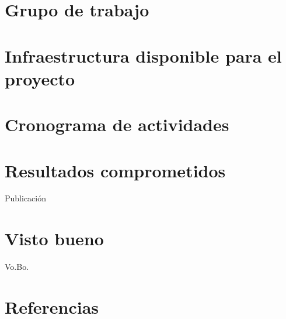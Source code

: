 \documentclass[12pt,letterpaper,final,titlepage]{article}
\begin{document}
\maketitle

\tableofcontents





\section {Grupo de trabajo}

\section {Infraestructura disponible para el proyecto}

\section {Cronograma de actividades}

\section {Resultados comprometidos}
Publicación
\section {Visto bueno}
Vo.Bo.
\section {Referencias}
\printbibliography[heading=none]
\end{document}

